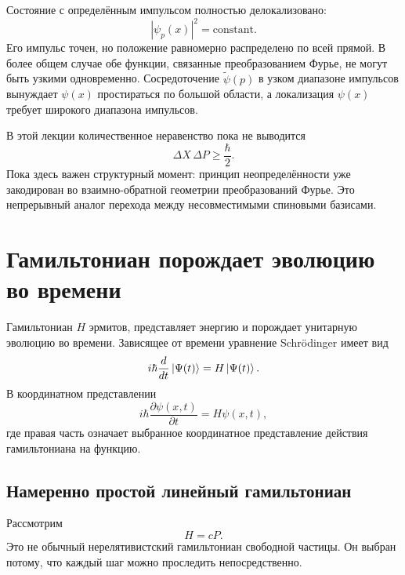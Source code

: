 Состояние с определённым импульсом полностью делокализовано:
\begin{equation}
|\psi_p(x)|^2=\text{constant}.
\end{equation}
Его импульс точен, но положение равномерно распределено по всей прямой. В более общем случае обе функции, связанные преобразованием Фурье, не могут быть узкими одновременно. Сосредоточение \(\widetilde{\psi}(p)\) в узком диапазоне импульсов вынуждает \(\psi(x)\) простираться по большой области, а локализация \(\psi(x)\) требует широкого диапазона импульсов.

В этой лекции количественное неравенство пока не выводится
\begin{equation}
\Delta X\,\Delta P\geq\frac{\hbar}{2}.
\end{equation}
Пока здесь важен структурный момент: принцип неопределённости уже закодирован во взаимно-обратной геометрии преобразований Фурье. Это непрерывный аналог перехода между несовместимыми спиновыми базисами.

\section{Гамильтониан порождает эволюцию во времени}

Гамильтониан \(H\) эрмитов, представляет энергию и порождает унитарную эволюцию во времени. Зависящее от времени уравнение Schr\"odinger имеет вид
\begin{equation}
i\hbar\frac{d}{dt}\left\lvert\Psi(t)\right\rangle
=
H\left\lvert\Psi(t)\right\rangle.
\label{eq:l9-abstract-schrodinger}
\end{equation}
В координатном представлении
\begin{equation}
i\hbar\frac{\partial\psi(x,t)}{\partial t}
=
H\psi(x,t),
\label{eq:l9-position-schrodinger}
\end{equation}
где правая часть означает выбранное координатное представление действия гамильтониана на функцию.

\subsection{Намеренно простой линейный гамильтониан}

Рассмотрим
\begin{equation}
H=cP.
\label{eq:l9-linear-hamiltonian}
\end{equation}
Это не обычный нерелятивистский гамильтониан свободной частицы. Он выбран потому, что каждый шаг можно проследить непосредственно.

